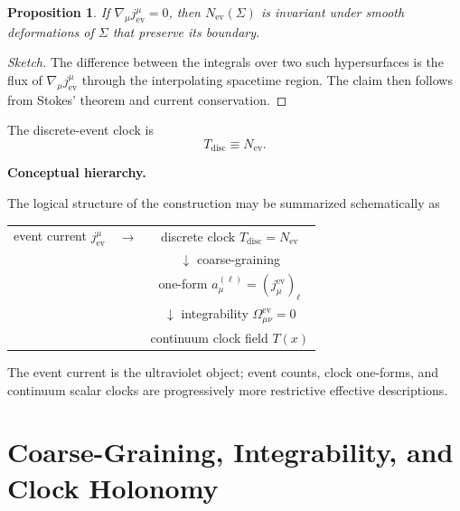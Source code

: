 \documentclass[11pt, a4paper]{article}
\theoremstyle{definition}
\theoremstyle{plain}
\newtheorem{proposition}{Proposition}[section]
\theoremstyle{remark}
\numberwithin{equation}{section}
\newcommand{\Sig}{\Sigma}
\newcommand{\Jev}{j^\mu_{\mathrm{ev}}}
\newcommand{\Nev}{N_{\mathrm{ev}}}
\begin{document}
    \begin{proposition}
        If $\nabla_\mu \Jev = 0$, then $\Nev(\Sig)$ is invariant under smooth deformations of $\Sig$ that preserve its boundary.
    \end{proposition}
    
    \begin{proof}[Sketch]
The difference between the integrals over two such hypersurfaces is the flux of $\nabla_\mu j^\mu_{\mathrm{ev}}$ through the interpolating spacetime region. The claim then follows from Stokes' theorem and current conservation.
    \end{proof}
    
    The discrete-event clock is
    \begin{equation}
        T_{\mathrm{disc}} \equiv \Nev .
    \end{equation}
    
    \medskip\noindent\textbf{Conceptual hierarchy.}\par
        The logical structure of the construction may be summarized schematically as
        \begin{center}
            \begin{tabular}{c c c}
                event current $j^\mu_{\mathrm{ev}}$
                & $\longrightarrow$ &
                discrete clock $T_{\mathrm{disc}} = N_{\mathrm{ev}}$ \\
                & &
                $\downarrow$ coarse-graining \\
                & &
                one-form $a^{(\ell)}_\mu=(j^{\mathrm{ev}}_\mu)_\ell$ \\
                & &
                $\downarrow$ integrability $\Omega^{\mathrm{ev}}_{\mu\nu}=0$ \\
                & &
                continuum clock field $T(x)$
            \end{tabular}
        \end{center}
        The event current is the ultraviolet object; event counts, clock one-forms, and continuum scalar clocks are progressively more restrictive effective descriptions.

    \section{Coarse-Graining, Integrability, and Clock Holonomy}
    \label{sec:clocklimit}
    
\end{document}

